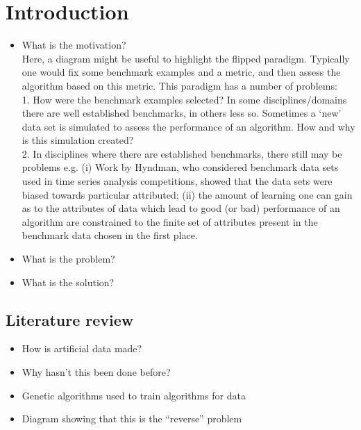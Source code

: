 \section{Introduction}\label{section:introduction}


\begin{itemize}
    \item What is the motivation?\\
    Here, a diagram might be useful to highlight the flipped paradigm. Typically one would fix some benchmark examples and a metric, and then assess the algorithm based on this metric. This paradigm has a number of problems:\\
    1. How were the benchmark examples selected? In some disciplines/domains there are well established benchmarks, in others less so. Sometimes a `new' data set is simulated to assess the performance of an algorithm. How and why is this simulation created?\\
    2. In disciplines where there are established benchmarks, there still may be problems e.g. (i) Work by Hyndman, who considered benchmark data sets used in time series analysis competitions, showed that the data sets were biased towards particular attributed; (ii) the amount of learning one can gain as to the attributes of data which lead to good (or bad) performance of an algorithm are constrained to the finite set of attributes present in the benchmark data chosen in the first place.
    \item What is the problem?
    \item What is the solution?
\end{itemize}

\subsection{Literature review}

\begin{itemize}
    \item How is artificial data made?
    \item Why hasn't this been done before?
    \item Genetic algorithms used to train algorithms for data
    \item Diagram showing that this is the ``reverse'' problem
\end{itemize}
